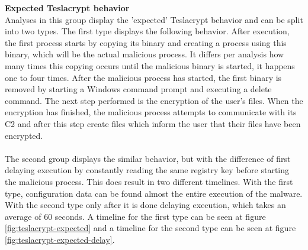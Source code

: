 \documentclass[conference]{IEEEtran}
\begin{document}
\textbf{Expected Teslacrypt behavior}\\
Analyses in this group display the 'expected' Teslacrypt behavior \cite{wyke-currans} and can be split into two types. The first type displays the following behavior. After execution, the first process starts by copying its binary and creating a process using this binary, which will be the actual malicious process. It differs per analysis how many times this copying occurs until the malicious binary is started, it happens one to four times. After the malicious process has started, the first binary is removed by starting a Windows command prompt and executing a delete command. The next step performed is the encryption of the user's files. When the encryption has finished, the malicious process attempts to communicate with its C2 and after this step create files which inform the user that their files have been encrypted.\\
\\The second group displays the similar behavior, but with the difference of first delaying execution by constantly reading the same registry key before starting the malicious process. This does result in two different timelines. With the first type, configuration data can be found almost the entire execution of the malware. With the second type only after it is done delaying execution, which takes an average of 60 seconds. A timeline for the first type can be seen at figure \ref{fig:teslacrypt-expected} and a timeline for the second type can be seen at figure \ref{fig:teslacrypt-expected-delay}.
\end{document}
